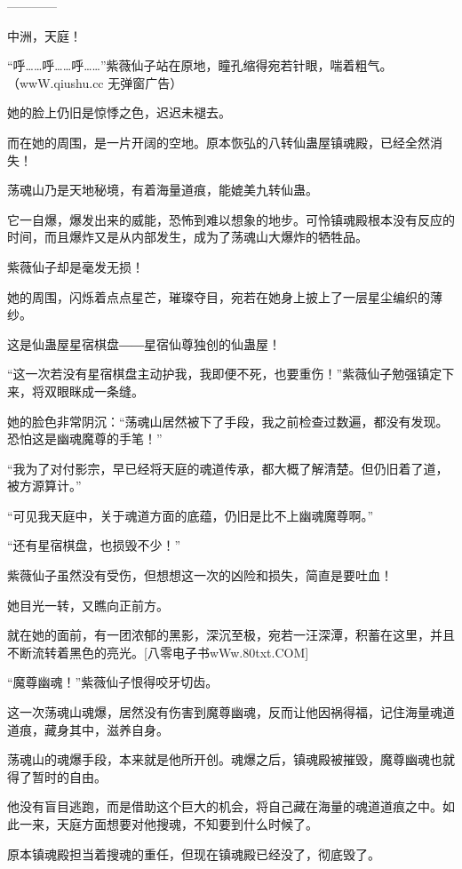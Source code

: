 
\begin{this_body}

------------

中洲，天庭！

“呼……呼……呼……”紫薇仙子站在原地，瞳孔缩得宛若针眼，喘着粗气。（wwW.qiushu.cc 无弹窗广告）

她的脸上仍旧是惊悸之色，迟迟未褪去。

而在她的周围，是一片开阔的空地。原本恢弘的八转仙蛊屋镇魂殿，已经全然消失！

荡魂山乃是天地秘境，有着海量道痕，能媲美九转仙蛊。

它一自爆，爆发出来的威能，恐怖到难以想象的地步。可怜镇魂殿根本没有反应的时间，而且爆炸又是从内部发生，成为了荡魂山大爆炸的牺牲品。

紫薇仙子却是毫发无损！

她的周围，闪烁着点点星芒，璀璨夺目，宛若在她身上披上了一层星尘编织的薄纱。

这是仙蛊屋星宿棋盘――星宿仙尊独创的仙蛊屋！

“这一次若没有星宿棋盘主动护我，我即便不死，也要重伤！”紫薇仙子勉强镇定下来，将双眼眯成一条缝。

她的脸色非常阴沉：“荡魂山居然被下了手段，我之前检查过数遍，都没有发现。恐怕这是幽魂魔尊的手笔！”

“我为了对付影宗，早已经将天庭的魂道传承，都大概了解清楚。但仍旧着了道，被方源算计。”

“可见我天庭中，关于魂道方面的底蕴，仍旧是比不上幽魂魔尊啊。”

“还有星宿棋盘，也损毁不少！”

紫薇仙子虽然没有受伤，但想想这一次的凶险和损失，简直是要吐血！

她目光一转，又瞧向正前方。

就在她的面前，有一团浓郁的黑影，深沉至极，宛若一汪深潭，积蓄在这里，并且不断流转着黑色的亮光。[八零电子书wWw.80txt.COM]

“魔尊幽魂！”紫薇仙子恨得咬牙切齿。

这一次荡魂山魂爆，居然没有伤害到魔尊幽魂，反而让他因祸得福，记住海量魂道道痕，藏身其中，滋养自身。

荡魂山的魂爆手段，本来就是他所开创。魂爆之后，镇魂殿被摧毁，魔尊幽魂也就得了暂时的自由。

他没有盲目逃跑，而是借助这个巨大的机会，将自己藏在海量的魂道道痕之中。如此一来，天庭方面想要对他搜魂，不知要到什么时候了。

原本镇魂殿担当着搜魂的重任，但现在镇魂殿已经没了，彻底毁了。


\end{this_body}
